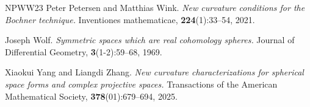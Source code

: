 \documentclass[11pt, reqno]{amsart}
\numberwithin{equation}{section}
\theoremstyle{definition}
\begin{document}
\begin{thebibliography}{NPWW23}
		Peter Petersen and Matthias Wink. \emph{New curvature conditions for the Bochner technique.} Inventiones
		mathematicae, \textbf{224}(1):33–54, 2021.
		
		Joseph Wolf. \emph{Symmetric spaces which are real cohomology spheres.} Journal of Differential Geometry,
		\textbf{3}(1-2):59–68, 1969.
		
		Xiaokui Yang and Liangdi Zhang. \emph{New curvature characterizations for spherical space forms and
			complex projective spaces.} Transactions of the American Mathematical Society, \textbf{378}(01):679–694,
		2025.
		
	\end{thebibliography}
	
	
\end{document}
